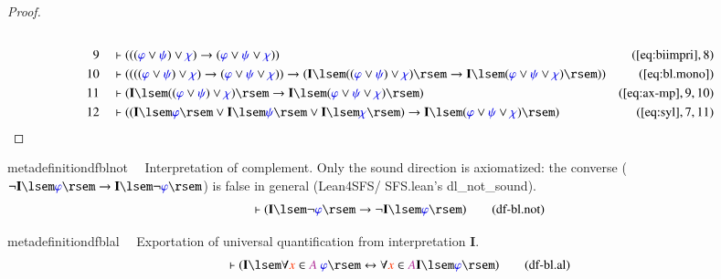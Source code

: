 \begin{proof}
\begin{align}
  \\ 9 &&  & \vdash ( ( ( \mw{\varphi} \vee \mw{\psi} ) \vee \mw{\chi}
      ) \rightarrow ( \mw{\varphi} \vee \mw{\psi} \vee \mw{\chi} )
      )&(\mbox{\ref{eq:biimpri}},8)\notag
  \\ 10 &&  & \vdash ( ( ( ( \mw{\varphi} \vee \mw{\psi} ) \vee
      \mw{\chi} ) \rightarrow ( \mw{\varphi} \vee \mw{\psi} \vee
      \mw{\chi} ) ) \rightarrow ( \mathbf{I} \lsem ( ( \mw{\varphi}
      \vee \mw{\psi} ) \vee \mw{\chi} ) \rsem \rightarrow \mathbf{I}
      \lsem ( \mw{\varphi} \vee \mw{\psi} \vee \mw{\chi} ) \rsem )
      )&(\mbox{\ref{eq:bl.mono}})\notag
  \\ 11 &&  & \vdash ( \mathbf{I} \lsem ( ( \mw{\varphi} \vee
      \mw{\psi} ) \vee \mw{\chi} ) \rsem \rightarrow \mathbf{I} \lsem
      ( \mw{\varphi} \vee \mw{\psi} \vee \mw{\chi} ) \rsem
      )&(\mbox{\ref{eq:ax-mp}},9,10)\notag
  \\ 12 &&  & \vdash ( ( \mathbf{I} \lsem \mw{\varphi} \rsem \vee
      \mathbf{I} \lsem \mw{\psi} \rsem \vee \mathbf{I} \lsem \mw{\chi}
      \rsem ) \rightarrow \mathbf{I} \lsem ( \mw{\varphi} \vee
      \mw{\psi} \vee \mw{\chi} ) \rsem
      )&(\mbox{\ref{eq:syl}},7,11)\notag
\end{align}
\end{proof}

\begin{restatable}{metadefinition}{dfblnot}~~ Interpretation of complement.  Only
the sound direction is axiomatized: the converse
($\lnot\mathbf{I}\lsem\mw{\varphi}\rsem \rightarrow
\mathbf{I}\lsem\lnot\mw{\varphi}\rsem$) is false in general (Lean4SFS/
SFS.lean's dl\_not\_sound).
\begin{align}
\vdash ( \mathbf{I} \lsem \lnot \mw{\varphi} \rsem \rightarrow \lnot
    \mathbf{I} \lsem \mw{\varphi} \rsem )\label{eq:df-bl.not}\tag{df-bl.not}
\end{align}
\end{restatable}

\begin{restatable}{metadefinition}{dfblal}~~ Exportation of universal quantification
from interpretation $\mathbf{I}$.
\begin{align}
\vdash ( \mathbf{I} \lsem \forall \msc{x} \in \mc{A}~\mw{\varphi} \rsem
    \leftrightarrow \forall \msc{x} \in \mc{A} \mathbf{I} \lsem \mw{\varphi}
    \rsem )\label{eq:df-bl.al}\tag{df-bl.al}
\end{align}
\end{restatable}

